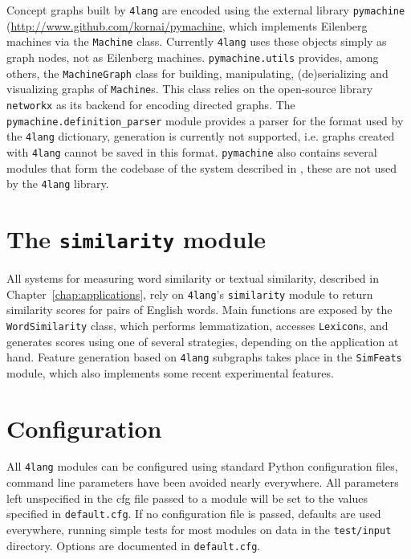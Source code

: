 \documentclass{article}
\newcommand{\fl}{\texttt{4lang}\xspace}
\begin{document}
Concept graphs built by \fl are encoded using the external library
\texttt{pymachine} (\url{http://www.github.com/kornai/pymachine}, which
implements Eilenberg machines via the \texttt{Machine} class.
Currently \fl uses these objects simply as graph nodes, not as Eilenberg
machines. \texttt{pymachine.utils} provides, among others, the
\texttt{MachineGraph} class for building, manipulating, (de)serializing and
visualizing graphs of \texttt{Machine}s. This class relies on the open-source
library \texttt{networkx} as its backend for encoding directed graphs. The
\texttt{pymachine.definition\_parser} module provides a parser for the
format used by the \fl dictionary, generation is currently not supported,
i.e. graphs created with \texttt{4lang} cannot be saved in this format.
\texttt{pymachine} also contains several modules that form the codebase of the
system described in \cite{Nemeskey:2013}, these are not used by the \fl
library.

\section{The \texttt{similarity} module}
All systems for measuring word similarity or textual similarity, described in
Chapter~\ref{chap:applications}, rely on \fl's \texttt{similarity} module to
return similarity scores for pairs of English words. Main functions are exposed
by the \texttt{WordSimilarity} class, which performs lemmatization, accesses
\texttt{Lexicon}s, and generates scores using one of several strategies,
depending on the application at hand. Feature generation based on \fl subgraphs takes place in the
\texttt{SimFeats} module,
which also implements some recent experimental features.


\label{sec:arch_sim}

\section{Configuration}
\label{sec:config}

All \fl modules can be configured using standard Python configuration files,
command line parameters have been avoided nearly everywhere. All parameters
left unspecified in the cfg file passed to a module will be set to the values
specified in \texttt{default.cfg}. If no configuration file is passed, defaults
are used everywhere, running simple tests for most modules on data in the
\texttt{test/input} directory. Options are documented in \texttt{default.cfg}.
\end{document}

